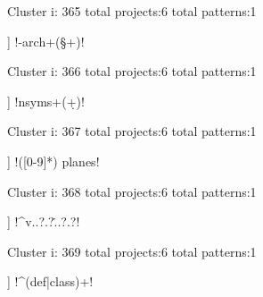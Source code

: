 Cluster i: 365
total projects:6
total patterns:1
\begin{multicols}{1}
\begin{description}[noitemsep,topsep=0pt]
\item [[6] ] \cverb!-arch\s+(\S+)!
\end{description}
\end{multicols}







Cluster i: 366
total projects:6
total patterns:1
\begin{multicols}{1}
\begin{description}[noitemsep,topsep=0pt]
\item [[6] ] \cverb!nsyms\s+(\d+)!
\end{description}
\end{multicols}







Cluster i: 367
total projects:6
total patterns:1
\begin{multicols}{1}
\begin{description}[noitemsep,topsep=0pt]
\item [[6] ] \cverb!([0-9]*) planes!
\end{description}
\end{multicols}







Cluster i: 368
total projects:6
total patterns:1
\begin{multicols}{1}
\begin{description}[noitemsep,topsep=0pt]
\item [[6] ] \cverb!^v..?.?\...?.?!
\end{description}
\end{multicols}







Cluster i: 369
total projects:6
total patterns:1
\begin{multicols}{1}
\begin{description}[noitemsep,topsep=0pt]
\item [[6] ] \cverb!^(def|class)\s+!
\end{description}
\end{multicols}







